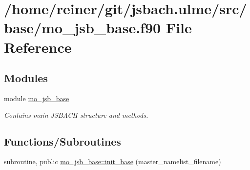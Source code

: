 \hypertarget{mo__jsb__base_8f90}{}\section{/home/reiner/git/jsbach.ulme/src/base/mo\+\_\+jsb\+\_\+base.f90 File Reference}
\label{mo__jsb__base_8f90}
\subsection*{Modules}
\begin{DoxyCompactItemize}
\item 
module \hyperlink{namespacemo__jsb__base}{mo\+\_\+jsb\+\_\+base}
\begin{DoxyCompactList}\small\item\em Contains main J\+S\+B\+A\+C\+H structure and methods. \end{DoxyCompactList}\end{DoxyCompactItemize}
\subsection*{Functions/\+Subroutines}
\begin{DoxyCompactItemize}
\item 
subroutine, public \hyperlink{namespacemo__jsb__base_ad811b441fdefcb99ec47d6c2a0d92659}{mo\+\_\+jsb\+\_\+base\+::init\+\_\+base} (master\+\_\+namelist\+\_\+filename)
\end{DoxyCompactItemize}
